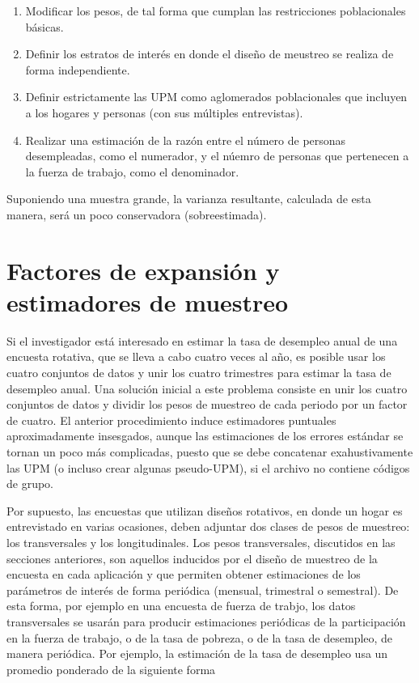 \begin{enumerate}
\def\labelenumi{\arabic{enumi}.}
\tightlist
\item
  Modificar los pesos, de tal forma que cumplan las restricciones poblacionales básicas.
\item
  Definir los estratos de interés en donde el diseño de meustreo se realiza de forma independiente.
\item
  Definir estrictamente las UPM como aglomerados poblacionales que incluyen a los hogares y personas (con sus múltiples entrevistas).
\item
  Realizar una estimación de la razón entre el número de personas desempleadas, como el numerador, y el núemro de personas que pertenecen a la fuerza de trabajo, como el denominador.
\end{enumerate}

Suponiendo una muestra grande, la varianza resultante, calculada de esta manera, será un poco conservadora (sobreestimada).

\hypertarget{factores-de-expansion-y-estimadores-de-muestreo}{%
\section{Factores de expansión y estimadores de muestreo}\label{factores-de-expansion-y-estimadores-de-muestreo}}

Si el investigador está interesado en estimar la tasa de desempleo anual de una encuesta rotativa, que se lleva a cabo cuatro veces al año, es posible usar los cuatro conjuntos de datos y unir los cuatro trimestres para estimar la tasa de desempleo anual. Una solución inicial a este problema consiste en unir los cuatro conjuntos de datos y dividir los pesos de muestreo de cada periodo por un factor de cuatro. El anterior procedimiento induce estimadores puntuales aproximadamente insesgados, aunque las estimaciones de los errores estándar se tornan un poco más complicadas, puesto que se debe concatenar exahustivamente las UPM (o incluso crear algunas pseudo-UPM), si el archivo no contiene códigos de grupo.

Por supuesto, las encuestas que utilizan diseños rotativos, en donde un hogar es entrevistado en varias ocasiones, deben adjuntar dos clases de pesos de muestreo: los transversales y los longitudinales. Los pesos transversales, discutidos en las secciones anteriores, son aquellos inducidos por el diseño de muestreo de la encuesta en cada aplicación y que permiten obtener estimaciones de los parámetros de interés de forma periódica (mensual, trimestral o semestral). De esta forma, por ejemplo en una encuesta de fuerza de trabjo, los datos transversales se usarán para producir estimaciones periódicas de la participación en la fuerza de trabajo, o de la tasa de pobreza, o de la tasa de desempleo, de manera periódica. Por ejemplo, la estimación de la tasa de desempleo usa un promedio ponderado de la siguiente forma

